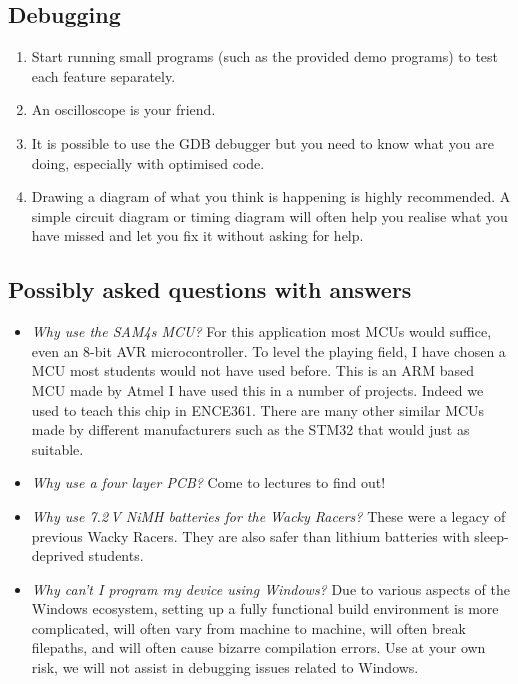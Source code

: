 \documentclass[11pt, a4paper]{article}
\begin{document}
\subsection{Debugging}

\begin{enumerate}
\item Start running small programs (such as the provided demo
  programs) to test each feature separately.
  
\item An oscilloscope is your friend.

\item It is possible to use the GDB debugger but you need to know what
  you are doing, especially with optimised code.

\item Drawing a diagram of what you think is happening is highly recommended. A
simple circuit diagram or timing diagram will often help you realise what you
have missed and let you fix it without asking for help.
  
\end{enumerate}


\subsection{Possibly asked questions with answers}

\begin{itemize}
\item \emph{Why use the SAM4s MCU?}  For this application most MCUs
  would suffice, even an 8-bit AVR microcontroller.  To level the
  playing field, I have chosen a MCU most students would not have used
  before.  This is an ARM based MCU made by Atmel I have used this in
  a number of projects.  Indeed we used to teach this chip in ENCE361.
  There are many other similar MCUs made by different manufacturers
  such as the STM32 that would just as suitable.

\item \emph{Why use a four layer PCB?}  Come to lectures to find out!

\item \emph{Why use 7.2\,V NiMH batteries for the Wacky Racers?}
  These were a legacy of previous Wacky Racers.  They are also safer
  than lithium batteries with sleep-deprived students.

\item \emph{Why can't I program my device using Windows?} Due to
  various aspects of the Windows ecosystem, setting up a fully
  functional build environment is more complicated, will often vary
  from machine to machine, will often break filepaths, and will often
  cause bizarre compilation errors. Use at your own risk, we will not
  assist in debugging issues related to Windows.

\end{itemize}
\end{document}
